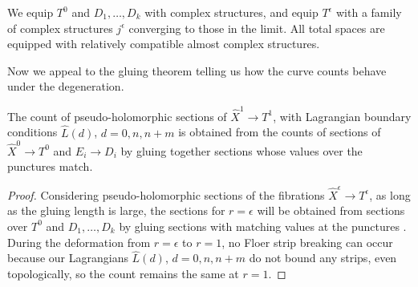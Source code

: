 \documentclass[12pt]{amsart}
\begin{document}
We equip $T^0$ and $D_1,\dots,D_k$ with complex structures, and equip $T^\epsilon$ with a family of complex structures $j^\epsilon$ converging to those in the limit. All total spaces are equipped with relatively compatible almost complex structures. 

Now we appeal to the gluing theorem \cite[Proposition 2.2]{seidel-les} telling us how the curve counts behave under the degeneration. 

\begin{proposition}
\label{prop:TQFT-gluing}  
  The count of pseudo-holomorphic sections of $\hat{X}^1 \to T^1$,
  with Lagrangian boundary conditions $\hat{L}(d)$, $d = 0 ,n ,n+m$ is
  obtained from the counts of sections of $\hat{X}^0 \to T^0$ and $E_i
  \to D_i$ by gluing together sections whose values over the punctures match.
\end{proposition}

\begin{proof}
Considering pseudo-holomorphic sections of the fibrations
$\hat{X}^\epsilon \to T^\epsilon$, as long as the gluing length is
large, the sections for $r = \epsilon$ will be obtained from sections
over $T^0$ and $D_1,\dots,D_k$ by gluing sections with matching values
at the punctures \cite[Proposition 2.2]{seidel-les}. During the deformation from $r = \epsilon$ to $r =
1$, no Floer strip breaking can occur because our Lagrangians
$\hat{L}(d)$, $d = 0, n, n+m$ do not bound any strips, even
topologically, so the count remains the same at $r = 1$.
\end{proof}

\end{document}
